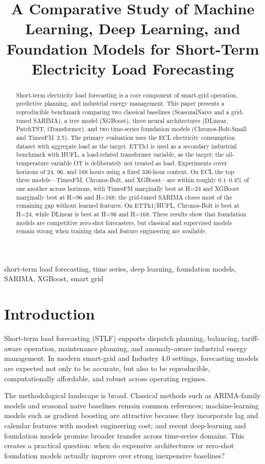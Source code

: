 \documentclass[conference]{IEEEtran}
\title{A Comparative Study of Machine Learning, Deep Learning, and Foundation Models for Short-Term Electricity Load Forecasting}
\author{
\IEEEauthorblockN{Author One}
\IEEEauthorblockA{\textit{Affiliation One}\\
City, Country\\
email1@example.com}
\and
\IEEEauthorblockN{Author Two}
\IEEEauthorblockA{\textit{Affiliation Two}\\
City, Country\\
email2@example.com}
}
\begin{document}
\maketitle

\begin{abstract}
Short-term electricity load forecasting is a core component of smart-grid operation, predictive planning, and industrial energy management. This paper presents a reproducible benchmark comparing two classical baselines (SeasonalNaive and a grid-tuned SARIMA), a tree model (XGBoost), three neural architectures (DLinear, PatchTST, iTransformer), and two time-series foundation models (Chronos-Bolt-Small and TimesFM~2.5). The primary evaluation uses the ECL electricity consumption dataset with aggregate load as the target. ETTh1 is used as a secondary industrial benchmark with HUFL, a load-related transformer variable, as the target; the oil-temperature variable OT is deliberately not treated as load. Experiments cover horizons of 24, 96, and 168 hours using a fixed 336-hour context. On ECL the top three models---TimesFM, Chronos-Bolt, and XGBoost---are within roughly $0.1$--$0.4\%$ of one another across horizons, with TimesFM marginally best at H=24 and XGBoost marginally best at H=96 and H=168; the grid-tuned SARIMA closes most of the remaining gap without learned features. On ETTh1/HUFL, Chronos-Bolt is best at H=24, while DLinear is best at H=96 and H=168. These results show that foundation models are competitive zero-shot forecasters, but classical and supervised models remain strong when training data and feature engineering are available.
\end{abstract}

\begin{IEEEkeywords}
short-term load forecasting, time series, deep learning, foundation models, SARIMA, XGBoost, smart grid
\end{IEEEkeywords}

\section{Introduction}
Short-term load forecasting (STLF) supports dispatch planning, balancing, tariff-aware operation, maintenance planning, and anomaly-aware industrial energy management. In modern smart-grid and Industry 4.0 settings, forecasting models are expected not only to be accurate, but also to be reproducible, computationally affordable, and robust across operating regimes.

The methodological landscape is broad. Classical methods such as ARIMA-family models and seasonal naive baselines remain common references; machine-learning models such as gradient boosting are attractive because they incorporate lag and calendar features with modest engineering cost; and recent deep-learning and foundation models promise broader transfer across time-series domains. This creates a practical question: when do expensive architectures or zero-shot foundation models actually improve over strong inexpensive baselines?
\end{document}
